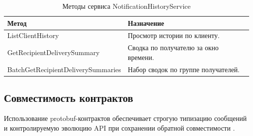 \begin{table}[h]
    \centering
    \footnotesize
    \renewcommand{\arraystretch}{1.15}
    \caption{Методы сервиса NotificationHistoryService}
    \label{tab:appendix-history-contracts}
    \begin{tabular}{|L{0.36\textwidth}|L{0.50\textwidth}|}
        \hline
        \textbf{Метод} & \textbf{Назначение} \\
        \hline
        ListClientHistory & Просмотр истории по клиенту. \\
        \hline
        GetRecipientDeliverySummary & Сводка по получателю за окно времени. \\
        \hline
        BatchGetRecipientDeliverySummaries & Набор сводок по группе получателей. \\
        \hline
    \end{tabular}
\end{table}

\subsection{Совместимость контрактов}

Использование protobuf-контрактов обеспечивает строгую типизацию сообщений и
контролируемую эволюцию API при сохранении обратной совместимости
\cite{grpc_docs}.
